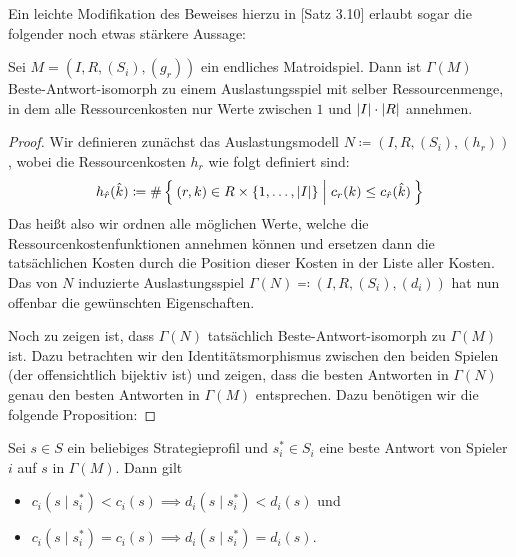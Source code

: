 Ein leichte Modifikation des Beweises hierzu in \cite{OptiIVSkript}[Satz 3.10] erlaubt sogar die folgender noch etwas stärkere Aussage:

\begin{satz}\label{satz:BAPotentialFuerMatroidspiele}
	Sei $M = (I, R, (S_i), (g_r))$ ein endliches Matroidspiel. Dann ist $\Gamma(M)$ Beste-Antwort-isomorph zu einem Auslastungsspiel mit selber Ressourcenmenge, in dem alle Ressourcenkosten nur Werte zwischen $1$ und $\left|I\right|\cdot\left|R\right|$ annehmen.
\end{satz}

\begin{proof}
	Wir definieren zunächst das Auslastungsmodell $N \coloneqq (I, R, (S_i), (h_r))$, wobei die Ressourcenkosten $h_r$ wie folgt definiert sind:
		\[h_{\hat{r}}(\hat{k}) \coloneqq \#\Set{(r, k) \in R\times \{1, \dots, \left|I\right|\} | c_r(k) \leq c_{\hat{r}}(\hat{k})} \]
	Das heißt also wir ordnen alle möglichen Werte, welche die Ressourcenkostenfunktionen annehmen können und ersetzen dann die tatsächlichen Kosten durch die Position dieser Kosten in der Liste aller Kosten. Das von $N$ induzierte Auslastungsspiel $\Gamma(N) \eqqcolon (I, R, (S_i), (d_i))$ hat nun offenbar die gewünschten Eigenschaften. 
	
	Noch zu zeigen ist, dass $\Gamma(N)$ tatsächlich Beste-Antwort-isomorph zu $\Gamma(M)$ ist. Dazu betrachten wir den Identitätsmorphismus zwischen den beiden Spielen (der offensichtlich bijektiv ist) und zeigen, dass die besten Antworten in $\Gamma(N)$ genau den besten Antworten in $\Gamma(M)$ entsprechen. Dazu benötigen wir die folgende Proposition:	\noqed
\end{proof}
	
\begin{prop}\label{prop:BAPotentialFuerMatroidspieleHilfsP}
	Sei $s \in S$ ein beliebiges Strategieprofil und $s^\ast_i \in S_i$ eine beste Antwort von Spieler $i$ auf $s$ in $\Gamma(M)$. Dann gilt
	\begin{itemize}
		\item $c_i(s \mid s^\ast_i) < c_i(s) \implies d_i(s \mid s^\ast_i) < d_i(s)$ und
		\item $c_i(s \mid s^\ast_i) = c_i(s) \implies d_i(s \mid s^\ast_i) = d_i(s)$.
	\end{itemize}
\end{prop}

